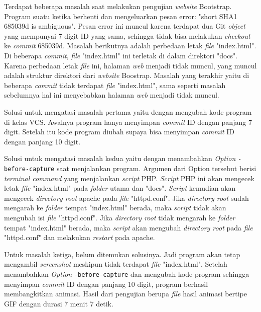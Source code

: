 \begin{enumerate}
Terdapat beberapa masalah saat melakukan pengujian \textit{website} Bootstrap. Program suatu ketika berhenti dan mengeluarkan pesan error: "short SHA1 685039d is ambiguous". Pesan error ini muncul karena terdapat dua Git \textit{object} yang mempunyai 7 digit ID yang sama, sehingga tidak bisa melakukan \textit{checkout} ke \textit{commit} 685039d. Masalah berikutnya adalah perbedaan letak \textit{file} "index.html". Di beberapa \textit{commit}, \textit{file} "index.html" ini terletak di dalam direktori "docs". Karena perbedaan letak \textit{file} ini, halaman \textit{web} menjadi tidak muncul, yang muncul adalah struktur direktori dari \textit{website} Boostrap. Masalah yang terakhir yaitu di beberapa \textit{commit} tidak terdapat \textit{file} "index.html", sama seperti masalah sebelumnya hal ini menyebabkan halaman \textit{web} menjadi tidak muncul.

Solusi untuk mengatasi masalah pertama yaitu dengan mengubah kode program di kelas VCS. Awalnya program hanya menyimpan \textit{commit} ID dengan panjang 7 digit. Setelah itu kode program diubah supaya bisa menyimpan \textit{commit} ID dengan panjang 10 digit. 

Solusi untuk mengatasi masalah kedua yaitu dengan menambahkan \textit{Option} \texttt{-before-capture} saat menjalankan program. Argumen dari Option tersebut berisi \textit{terminal command} yang menjalankan \textit{script} PHP. \textit{Script} PHP ini akan mengecek letak \textit{file} "index.html" pada \textit{folder} utama dan "docs". \textit{Script} kemudian akan mengecek \textit{directory root} apache pada \textit{file} "httpd.conf". Jika \textit{directory root} sudah mengarah ke \textit{folder} tempat "index.html" berada, maka \textit{script} tidak akan mengubah isi \textit{file} "httpd.conf". Jika \textit{directory root} tidak mengarah ke \textit{folder} tempat "index.html" berada, maka \textit{script} akan mengubah \textit{directory root} pada \textit{file} "httpd.conf" dan melakukan \textit{restart} pada apache.

Untuk masalah ketiga, belum ditemukan solusinya. Jadi program akan tetap mengambil \textit{screenshot} meskipun tidak terdapat \textit{file} "index.html". Setelah menambahkan \textit{Option} \texttt{-before-capture} dan mengubah kode program sehingga menyimpan \textit{commit} ID dengan panjang 10 digit, program berhasil membangkitkan animasi. Hasil dari pengujian berupa \textit{file} hasil animasi bertipe GIF dengan durasi 7 menit   7 detik.



\end{enumerate}